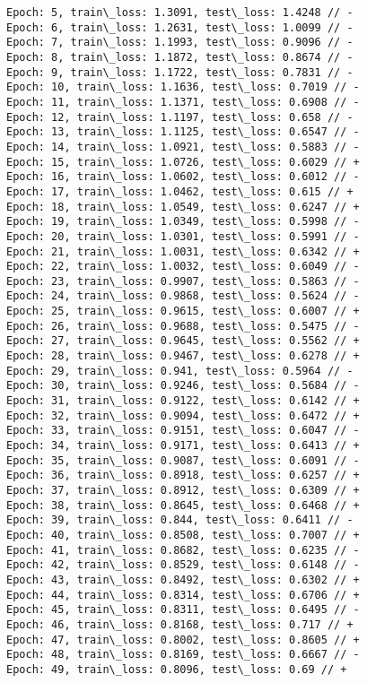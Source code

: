 \documentclass[11pt]{article}
\begin{document}
    
    \begin{Verbatim}[commandchars=\\\{\}]
Epoch: 5, train\_loss: 1.3091, test\_loss: 1.4248 // -
Epoch: 6, train\_loss: 1.2631, test\_loss: 1.0099 // -
Epoch: 7, train\_loss: 1.1993, test\_loss: 0.9096 // -
Epoch: 8, train\_loss: 1.1872, test\_loss: 0.8674 // -
Epoch: 9, train\_loss: 1.1722, test\_loss: 0.7831 // -
Epoch: 10, train\_loss: 1.1636, test\_loss: 0.7019 // -
Epoch: 11, train\_loss: 1.1371, test\_loss: 0.6908 // -
Epoch: 12, train\_loss: 1.1197, test\_loss: 0.658 // -
Epoch: 13, train\_loss: 1.1125, test\_loss: 0.6547 // -
Epoch: 14, train\_loss: 1.0921, test\_loss: 0.5883 // -
Epoch: 15, train\_loss: 1.0726, test\_loss: 0.6029 // +
Epoch: 16, train\_loss: 1.0602, test\_loss: 0.6012 // -
Epoch: 17, train\_loss: 1.0462, test\_loss: 0.615 // +
Epoch: 18, train\_loss: 1.0549, test\_loss: 0.6247 // +
Epoch: 19, train\_loss: 1.0349, test\_loss: 0.5998 // -
Epoch: 20, train\_loss: 1.0301, test\_loss: 0.5991 // -
Epoch: 21, train\_loss: 1.0031, test\_loss: 0.6342 // +
Epoch: 22, train\_loss: 1.0032, test\_loss: 0.6049 // -
Epoch: 23, train\_loss: 0.9907, test\_loss: 0.5863 // -
Epoch: 24, train\_loss: 0.9868, test\_loss: 0.5624 // -
Epoch: 25, train\_loss: 0.9615, test\_loss: 0.6007 // +
Epoch: 26, train\_loss: 0.9688, test\_loss: 0.5475 // -
Epoch: 27, train\_loss: 0.9645, test\_loss: 0.5562 // +
Epoch: 28, train\_loss: 0.9467, test\_loss: 0.6278 // +
Epoch: 29, train\_loss: 0.941, test\_loss: 0.5964 // -
Epoch: 30, train\_loss: 0.9246, test\_loss: 0.5684 // -
Epoch: 31, train\_loss: 0.9122, test\_loss: 0.6142 // +
Epoch: 32, train\_loss: 0.9094, test\_loss: 0.6472 // +
Epoch: 33, train\_loss: 0.9151, test\_loss: 0.6047 // -
Epoch: 34, train\_loss: 0.9171, test\_loss: 0.6413 // +
Epoch: 35, train\_loss: 0.9087, test\_loss: 0.6091 // -
Epoch: 36, train\_loss: 0.8918, test\_loss: 0.6257 // +
Epoch: 37, train\_loss: 0.8912, test\_loss: 0.6309 // +
Epoch: 38, train\_loss: 0.8645, test\_loss: 0.6468 // +
Epoch: 39, train\_loss: 0.844, test\_loss: 0.6411 // -
Epoch: 40, train\_loss: 0.8508, test\_loss: 0.7007 // +
Epoch: 41, train\_loss: 0.8682, test\_loss: 0.6235 // -
Epoch: 42, train\_loss: 0.8529, test\_loss: 0.6148 // -
Epoch: 43, train\_loss: 0.8492, test\_loss: 0.6302 // +
Epoch: 44, train\_loss: 0.8314, test\_loss: 0.6706 // +
Epoch: 45, train\_loss: 0.8311, test\_loss: 0.6495 // -
Epoch: 46, train\_loss: 0.8168, test\_loss: 0.717 // +
Epoch: 47, train\_loss: 0.8002, test\_loss: 0.8605 // +
Epoch: 48, train\_loss: 0.8169, test\_loss: 0.6667 // -
Epoch: 49, train\_loss: 0.8096, test\_loss: 0.69 // +

\end{Verbatim}
\end{document}

